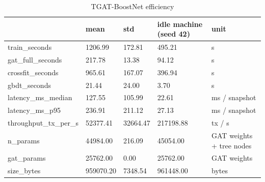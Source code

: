 \begin{table}
\caption{TGAT-BoostNet efficiency}
\label{tab:02_efficiency}
\begin{tabular}{lllll}
\toprule
 & mean & std & idle machine (seed 42) & unit \\
\midrule
train\_seconds & 1206.99 & 172.81 & 495.21 & s \\
gat\_full\_seconds & 217.78 & 13.38 & 94.12 & s \\
crossfit\_seconds & 965.61 & 167.07 & 396.94 & s \\
gbdt\_seconds & 21.44 & 24.00 & 3.70 & s \\
latency\_ms\_median & 127.55 & 105.99 & 22.61 & ms / snapshot \\
latency\_ms\_p95 & 236.91 & 211.12 & 27.13 & ms / snapshot \\
throughput\_tx\_per\_s & 52377.41 & 32664.47 & 217198.88 & tx / s \\
n\_params & 44984.00 & 216.09 & 45054.00 & GAT weights + tree nodes \\
gat\_params & 25762.00 & 0.00 & 25762.00 & GAT weights \\
size\_bytes & 959070.20 & 7348.54 & 961448.00 & bytes \\
\bottomrule
\end{tabular}
\end{table}
